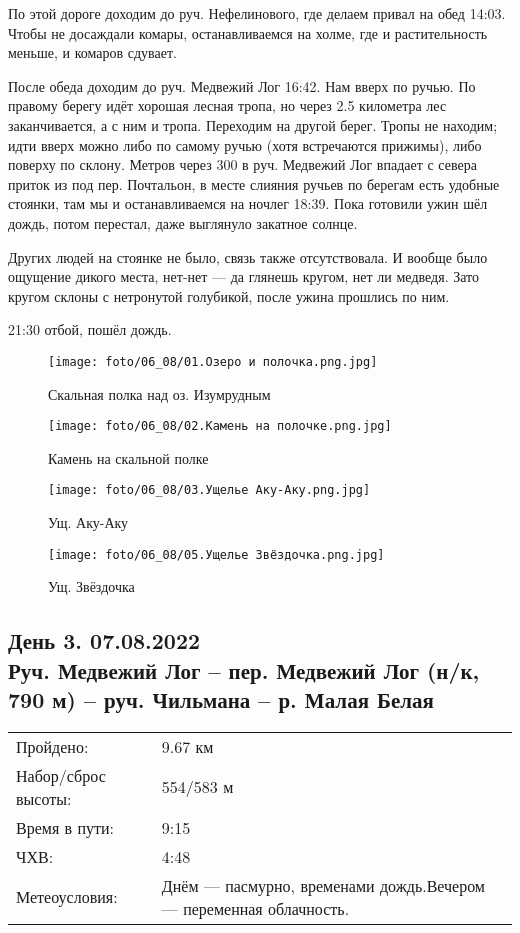 По этой дороге доходим до руч. Нефелинового, где делаем привал на обед 14:03. Чтобы не досаждали комары,
останавливаемся на холме, где и растительность меньше, и комаров сдувает.

После обеда доходим до руч. Медвежий Лог 16:42. Нам вверх по ручью. По правому берегу идёт хорошая лесная тропа,
но через 2.5 километра лес заканчивается, а с ним и тропа. Переходим на другой берег. Тропы не находим;
идти вверх можно либо по самому ручью (хотя встречаются прижимы), либо поверху по склону. Метров через
300 в руч. Медвежий Лог впадает с севера приток из под пер. Почтальон, в месте слияния ручьев по берегам
есть удобные стоянки, там мы и останавливаемся на ночлег 18:39.
Пока готовили ужин шёл дождь, потом перестал, даже выглянуло закатное солнце.

Других людей на стоянке не было, связь также отсутствовала. И вообще было ощущение дикого места,
нет-нет --- да глянешь кругом, нет ли медведя. Зато кругом склоны с нетронутой голубикой, после ужина прошлись по ним.

21:30 отбой, пошёл дождь.

\begin{figure}
    \centering
    \texttt{[image: foto/06\_08/01.Озеро и полочка.png.jpg]}
    \caption{Скальная полка над оз. Изумрудным}
    \label{fig2:1}
\end{figure}

\begin{figure}
    \centering
    \texttt{[image: foto/06\_08/02.Камень на полочке.png.jpg]}
    \caption{Камень на скальной полке}
    \label{fig2:2}
\end{figure}

\begin{figure}
    \centering
    \texttt{[image: foto/06\_08/03.Ущелье Аку-Аку.png.jpg]}
    \caption{Ущ. Аку-Аку}
    \label{fig2:3}
\end{figure}

\begin{figure}
    \centering
    \texttt{[image: foto/06\_08/05.Ущелье Звёздочка.png.jpg]}
    \caption{Ущ. Звёздочка}
    \label{fig2:4}
\end{figure}

\FloatBarrier

\subsection{День 3. 07.08.2022\\
Руч. Медвежий Лог -- пер. Медвежий Лог (н/к, 790 м) -- руч. Чильмана -- р. Малая Белая}
\begin{tabular}{l p{12cm}}
\hline
Пройдено: & 9.67 км\\
Набор/сброс высоты: & 554/583 м\\
Время в пути: & 9:15\\
ЧХВ: & 4:48\\
Метеоусловия: & Днём --- пасмурно, временами дождь.\hfill \break Вечером --- переменная облачность.\\
\hline
\end{tabular}


